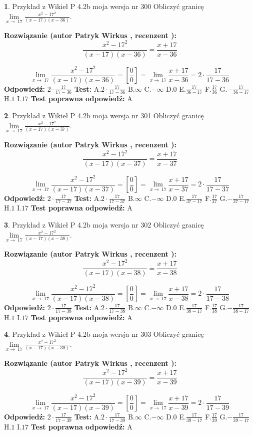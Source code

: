 \documentclass[12pt, a4paper]{article}
\theoremstyle{definition} %
\newtheorem{zad}{}
\newcommand{\zadStart}[1]{\begin{zad}#1\newline}
\newcommand{\zadStop}{\end{zad}}
\newcommand{\rozwStart}[2]{\noindent \textbf{Rozwiązanie (autor #1 , recenzent #2): }\newline}
\newcommand{\rozwStop}{\newline}
\newcommand{\odpStart}{\noindent \textbf{Odpowiedź:}\newline}
\newcommand{\odpStop}{\newline}
\newcommand{\testStart}{\noindent \textbf{Test:}\newline}
\newcommand{\testStop}{\newline}
\newcommand{\kluczStart}{\noindent \textbf{Test poprawna odpowiedź:}\newline}
\newcommand{\kluczStop}{\newline}
\begin{document}
\zadStart{Przykład z Wikieł P 4.2b moja wersja nr 300}
Obliczyć granicę $\lim\limits_{x\to\ 17}\frac{x^{2}-17^{2}}{(x-17)(x-36)}$.
\zadStop
\rozwStart{Patryk Wirkus}{}
$$\frac{x^{2}-17^{2}}{(x-17)(x-36)}=\frac{x+17}{x-36}$$

$$\lim\limits_{x\to\ 17}\frac{x^{2}-17^{2}}{(x-17)(x-36)}=[\frac{0}{0}]=\lim\limits_{x\to\ 17}\frac{x+17}{x-36}=2 \cdot \frac{17}{17-36}$$
\rozwStop
\odpStart
$2 \cdot \frac{17}{17-36}$
\odpStop
\testStart
A.$2 \cdot \frac{17}{17-36}$
B.$\infty$
C.$-\infty$
D.$0$
E.$\frac{17}{36-17}$
F.$\frac{17}{36}$
G.$-\frac{17}{36-17}$
H.$1$
I.$17$
\testStop
\kluczStart
A
\kluczStop



\zadStart{Przykład z Wikieł P 4.2b moja wersja nr 301}
Obliczyć granicę $\lim\limits_{x\to\ 17}\frac{x^{2}-17^{2}}{(x-17)(x-37)}$.
\zadStop
\rozwStart{Patryk Wirkus}{}
$$\frac{x^{2}-17^{2}}{(x-17)(x-37)}=\frac{x+17}{x-37}$$

$$\lim\limits_{x\to\ 17}\frac{x^{2}-17^{2}}{(x-17)(x-37)}=[\frac{0}{0}]=\lim\limits_{x\to\ 17}\frac{x+17}{x-37}=2 \cdot \frac{17}{17-37}$$
\rozwStop
\odpStart
$2 \cdot \frac{17}{17-37}$
\odpStop
\testStart
A.$2 \cdot \frac{17}{17-37}$
B.$\infty$
C.$-\infty$
D.$0$
E.$\frac{17}{37-17}$
F.$\frac{17}{37}$
G.$-\frac{17}{37-17}$
H.$1$
I.$17$
\testStop
\kluczStart
A
\kluczStop



\zadStart{Przykład z Wikieł P 4.2b moja wersja nr 302}
Obliczyć granicę $\lim\limits_{x\to\ 17}\frac{x^{2}-17^{2}}{(x-17)(x-38)}$.
\zadStop
\rozwStart{Patryk Wirkus}{}
$$\frac{x^{2}-17^{2}}{(x-17)(x-38)}=\frac{x+17}{x-38}$$

$$\lim\limits_{x\to\ 17}\frac{x^{2}-17^{2}}{(x-17)(x-38)}=[\frac{0}{0}]=\lim\limits_{x\to\ 17}\frac{x+17}{x-38}=2 \cdot \frac{17}{17-38}$$
\rozwStop
\odpStart
$2 \cdot \frac{17}{17-38}$
\odpStop
\testStart
A.$2 \cdot \frac{17}{17-38}$
B.$\infty$
C.$-\infty$
D.$0$
E.$\frac{17}{38-17}$
F.$\frac{17}{38}$
G.$-\frac{17}{38-17}$
H.$1$
I.$17$
\testStop
\kluczStart
A
\kluczStop



\zadStart{Przykład z Wikieł P 4.2b moja wersja nr 303}
Obliczyć granicę $\lim\limits_{x\to\ 17}\frac{x^{2}-17^{2}}{(x-17)(x-39)}$.
\zadStop
\rozwStart{Patryk Wirkus}{}
$$\frac{x^{2}-17^{2}}{(x-17)(x-39)}=\frac{x+17}{x-39}$$

$$\lim\limits_{x\to\ 17}\frac{x^{2}-17^{2}}{(x-17)(x-39)}=[\frac{0}{0}]=\lim\limits_{x\to\ 17}\frac{x+17}{x-39}=2 \cdot \frac{17}{17-39}$$
\rozwStop
\odpStart
$2 \cdot \frac{17}{17-39}$
\odpStop
\testStart
A.$2 \cdot \frac{17}{17-39}$
B.$\infty$
C.$-\infty$
D.$0$
E.$\frac{17}{39-17}$
F.$\frac{17}{39}$
G.$-\frac{17}{39-17}$
H.$1$
I.$17$
\testStop
\kluczStart
A
\kluczStop
\end{document}
